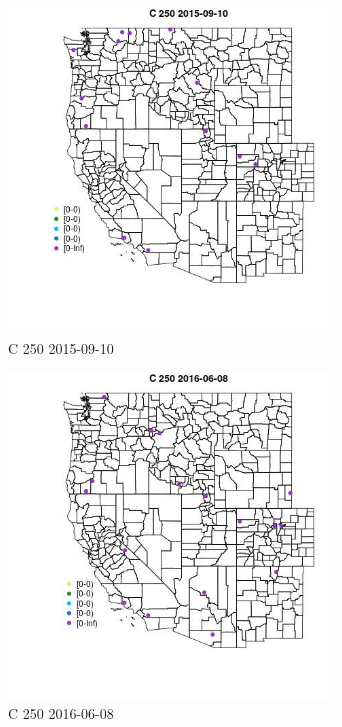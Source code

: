 \begin{figure} 
\centering  
\includegraphics[width=0.77\textwidth]{Code_Outputs/Report_ML_input_PM25_Step4_part_e_de_duplicated_aves_MapObsC_2502015-09-10.jpg} 
\caption{\label{fig:Report_ML_input_PM25_Step4_part_e_de_duplicated_avesMapObsC_2502015-09-10}C 250 2015-09-10} 
\end{figure} 
 

\begin{figure} 
\centering  
\includegraphics[width=0.77\textwidth]{Code_Outputs/Report_ML_input_PM25_Step4_part_e_de_duplicated_aves_MapObsC_2502016-06-08.jpg} 
\caption{\label{fig:Report_ML_input_PM25_Step4_part_e_de_duplicated_avesMapObsC_2502016-06-08}C 250 2016-06-08} 
\end{figure} 
 

